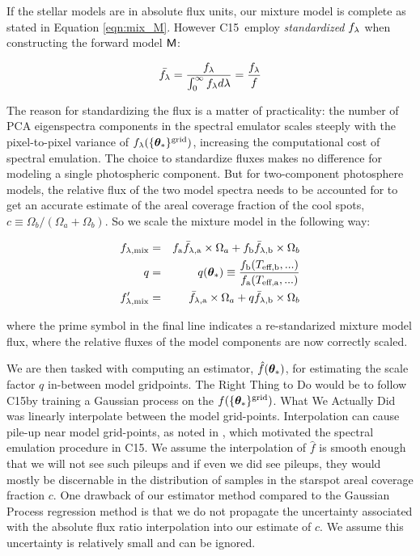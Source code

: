 \documentclass[twocolumn]{emulateapj}%
\newcommand{\iancze}{{\sc C15}}
\begin{document}
If the stellar models are in absolute flux units, our mixture model is complete as stated in Equation \ref{eqn:mix_M}.  However \iancze\ employ \emph{standardized} $f_\lambda$ when constructing the forward model $\mathsf{M}$:


\begin{eqnarray} \label{eqn:normalization}
\bar {f_\lambda} = \frac{f_\lambda}{\int_{0}^{\infty} f_\lambda d\lambda} = \frac{f_\lambda}{f}
\end{eqnarray}

The reason for standardizing the flux is a matter of practicality: the number of PCA eigenspectra components in the spectral emulator scales steeply with the pixel-to-pixel variance of $f_{\lambda}(\{{\bm \theta}_{\ast}\}^\textrm{grid})$, increasing the computational cost of spectral emulation.  The choice to standardize fluxes makes no difference for modeling a single photospheric component.  But for two-component photosphere models, the relative flux of the two model spectra needs to be accounted for to get an accurate estimate of the areal coverage fraction of the cool spots, $c \equiv \Omega_b/(\Omega_a+\Omega_b)$.  So we scale the mixture model in the following way:

\begin{eqnarray} \label{eqn:norm_scaling}
f_{\lambda, \mathrm{mix}} &=& f_{\mathrm{a}} \bar f_{\lambda, \mathrm{a}} \times \Omega_a + f_{\mathrm{b}} \bar f_{\lambda, \mathrm{b}} \times \Omega_b \\
q &=& q({\bm \theta}_{\ast})\equiv \frac{f_{\mathrm{b}}(T_\textrm{eff,b}, ...)}{f_{\mathrm{a}}(T_\textrm{eff,a}, ...)} \\
f_{\lambda, \mathrm{mix}}^{\prime} &=& \bar f_{\lambda, \mathrm{a}} \times \Omega_a + q \bar f_{\lambda, \mathrm{b}} \times \Omega_b
\end{eqnarray}

where the prime symbol in the final line indicates a re-standarized mixture model flux, where the relative fluxes of the model components are now correctly scaled.

We are then tasked with computing an estimator, $\hat f({\bm \theta}_{\ast})$, for estimating the scale factor $q$ in-between model gridpoints.  The Right Thing to Do would be to follow \iancze by training a Gaussian process on the $f(\{{\bm \theta}_{\ast}\}^\textrm{grid})$.  What We Actually Did was linearly interpolate between the model grid-points.  Interpolation can cause pile-up near model grid-points, as noted in \citet{cottaar14}, which motivated the spectral emulation procedure in \iancze.  We assume the interpolation of $\hat f$ is smooth enough that we will not see such pileups and if even we did see pileups, they would mostly be discernable in the distribution of samples in the starspot areal coverage fraction $c$.  One drawback of our estimator method compared to the Gaussian Process regression method is that we do not propagate the uncertainty associated with the absolute flux ratio interpolation into our estimate of $c$.  We assume this uncertainty is relatively small and can be ignored.
\end{document}
